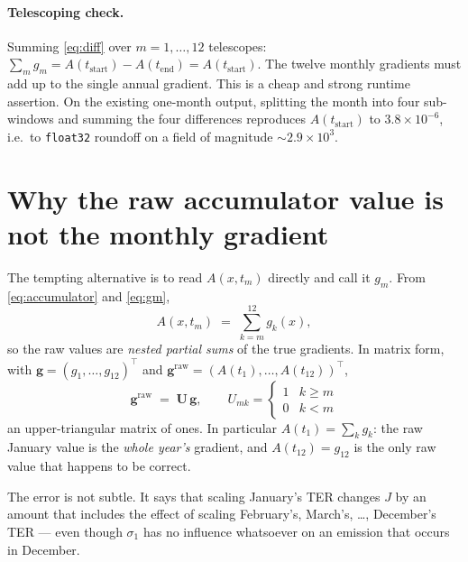 \documentclass[12pt]{article}
\newcommand{\bm}[1]{\mathbf{#1}}
\newcommand{\tend}{t_{\mathrm{end}}}
\newcommand{\tstart}{t_{\mathrm{start}}}
\newcommand{\Adj}{A}
\begin{document}
\paragraph{Telescoping check.} Summing \eqref{eq:diff} over $m=1,\dots,12$ telescopes:
$\sum_m g_m = \Adj(\tstart) - \Adj(\tend) = \Adj(\tstart)$. The twelve monthly
gradients must add up to the single annual gradient. This is a cheap and strong
runtime assertion. On the existing one-month output, splitting the month into four
sub-windows and summing the four differences reproduces $\Adj(\tstart)$ to
$3.8 \times 10^{-6}$, i.e.\ to \texttt{float32} roundoff on a field of magnitude
$\sim\!2.9\times10^{3}$.

\section{Why the raw accumulator value is not the monthly gradient}

The tempting alternative is to read $\Adj(x,t_m)$ directly and call it $g_m$. From
\eqref{eq:accumulator} and \eqref{eq:gm},
%
\begin{equation}
  \Adj(x,t_m) \;=\; \sum_{k=m}^{12} g_k(x),
  \label{eq:nested}
\end{equation}
%
so the raw values are \emph{nested partial sums} of the true gradients. In matrix
form, with $\bm{g} = (g_1,\dots,g_{12})^{\!\top}$ and
$\bm{g}^{\mathrm{raw}} = (\Adj(t_1),\dots,\Adj(t_{12}))^{\!\top}$,
%
\begin{equation}
  \bm{g}^{\mathrm{raw}} \;=\; \bm{U}\,\bm{g},
  \qquad
  U_{mk} = \begin{cases} 1 & k \ge m \\ 0 & k < m \end{cases}
\end{equation}
%
an upper-triangular matrix of ones. In particular $\Adj(t_1) = \sum_k g_k$: the raw
January value is the \emph{whole year's} gradient, and $\Adj(t_{12}) = g_{12}$ is the
only raw value that happens to be correct.

The error is not subtle. It says that scaling January's TER changes $J$ by an amount
that includes the effect of scaling February's, March's, \dots, December's TER --- even
though $\sigma_1$ has no influence whatsoever on an emission that occurs in December.
\end{document}
